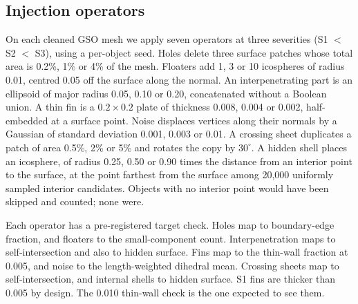 \subsection{Injection operators}
On each cleaned GSO mesh we apply seven operators at three severities (S1 \(<\) S2 \(<\) S3), using a per-object seed.
Holes delete three surface patches whose total area is 0.2\%, 1\% or 4\% of the mesh.
Floaters add 1, 3 or 10 icospheres of radius 0.01, centred 0.05 off the surface along the normal.
An interpenetrating part is an ellipsoid of major radius 0.05, 0.10 or 0.20, concatenated without a Boolean union.
A thin fin is a \(0.2 \times 0.2\) plate of thickness 0.008, 0.004 or 0.002, half-embedded at a surface point.
Noise displaces vertices along their normals by a Gaussian of standard deviation 0.001, 0.003 or 0.01.
A crossing sheet duplicates a patch of area 0.5\%, 2\% or 5\% and rotates the copy by \(30^\circ\).
A hidden shell places an icosphere, of radius 0.25, 0.50 or 0.90 times the distance from an interior point to the surface, at the point farthest from the surface among 20{,}000 uniformly sampled interior candidates.
Objects with no interior point would have been skipped and counted; none were.

Each operator has a pre-registered target check.
Holes map to boundary-edge fraction, and floaters to the small-component count.
Interpenetration maps to self-intersection and also to hidden surface.
Fins map to the thin-wall fraction at 0.005, and noise to the length-weighted dihedral mean.
Crossing sheets map to self-intersection, and internal shells to hidden surface.
S1 fins are thicker than 0.005 by design.
The 0.010 thin-wall check is the one expected to see them.
